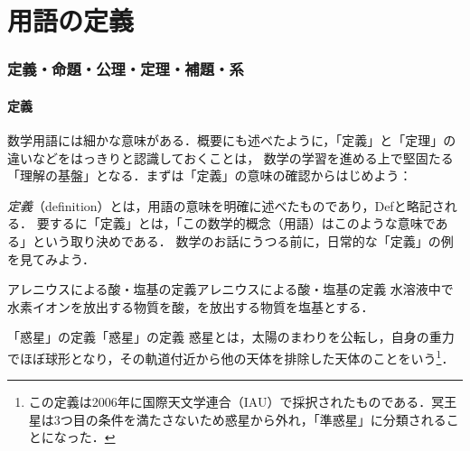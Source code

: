 \part{用語の定義}

\begin{abstract}
  この章では，数学の学習を始める前に，定義・命題・公理・定理・補題・系などの基本的な用語について理解を深める．「『命題』という言葉は知っているけど，『定理』とはどう違うの？」という疑問を持ったり，「『定義』と『定理』の違いがあやふやなままで，よくわからない」と感じる学生は多い．まず，日常的な例と数学的な例をもとに「定義」の性質を確認する．次に，命題・定理・補題・系という用語を整理し，これらのラベルの使い分けについて注意を述べる．最後に，「かつ・または」「とる・おく・固定する」「十分大きい」など，数学に特有の言い回しを具体例とともに確認しよう．
\end{abstract}

\section{定義・命題・公理・定理・補題・系}

\subsection{定義}

数学用語には細かな意味がある．概要にも述べたように，「定義」と「定理」の違いなどをはっきりと認識しておくことは，
数学の学習を進める上で堅固たる「理解の基盤」となる．まずは「定義」の意味の確認からはじめよう：

\emph{定義}（definition）とは，用語の意味を明確に述べたものであり，Defと略記される．
要するに「定義」とは，「この数学的概念（用語）はこのような意味である」という取り決めである．
数学のお話にうつる前に，日常的な「定義」の例を見てみよう．

\begin{example}{アレニウスによる酸・塩基の定義}{アレニウスによる酸・塩基の定義}
  水溶液中で水素イオンを放出する物質を酸，を放出する物質を塩基とする．
\end{example}

\begin{example}{「惑星」の定義}{「惑星」の定義}
  惑星とは，太陽のまわりを公転し，自身の重力でほぼ球形となり，その軌道付近から他の天体を排除した天体のことをいう\footnote{この定義は2006年に国際天文学連合（IAU）で採択されたものである．冥王星は3つ目の条件を満たさないため惑星から外れ，「準惑星」に分類されることになった．}．
\end{example}

